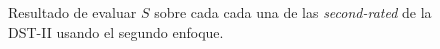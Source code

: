 \begin{figure}
	\centering
	\caption{Resultado de evaluar $S$ sobre cada cada una de las \textit{second-rated} de la DST-II usando el segundo enfoque.} \label{fig:gaussian-example-approach2}
\end{figure}

